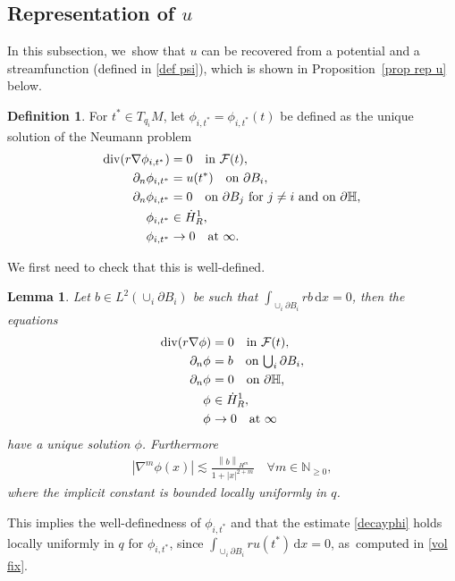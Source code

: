 \documentclass[10pt]{amsart}
\let\ts\textstyle
\newtheorem{lemma}[theorem]{Lemma}
\theoremstyle{definition}
\newtheorem{definition}[theorem]{Definition}
\renewcommand{\div}{\operatorname{div}}
\newcommand\N{\mathbb{N}}
\newcommand\norm[1]{\left\lVert #1\right\rVert}
\newcommand\eq{=}
\newcommand\dd{\,\mathrm{d}}
\newcommand\dx{\dd x}
\let\de\partial
\begin{document}
\subsection{Representation of $u$}\label{repU}
In this subsection, we~show that $u$ can be recovered from a potential and a streamfunction (defined in \ref{def psi}), which is shown in Proposition~\ref{prop rep u} below.

\begin{definition}
For $t^*\in T_{q_i}M$, let $\phi_{i,t^*}=\phi_{i,t^*}(t)$ be defined as the unique solution of the Neumann problem
\begin{align*}
\div(r\nabla\phi_{i,t^*})&\eq0 \quad\text{\normalfont{in} $\mathcal{F}(t)$},\\
\de_n\phi_{i,t^*}&\eq u(t^*) \quad\text{\normalfont{on} $\de B_i$},\\
\de_n\phi_{i,t^*}&\eq 0 \quad\text{\normalfont{on} $\de B_j$ \normalfont{for} $j\neq i$ \normalfont{and on} $\de\mathbb{H}$},\\
\phi_{i,t^*}&\in \dot{H}_R^1,\\
\phi_{i,t^*}&\to 0\quad\text{at $\infty$}.
\end{align*}
\end{definition}

We first need to check that this is well-defined.

\begin{lemma}\label{ExistencePhi}
Let $b\in L^2(\cup_i \de B_i)$ be such that $\int_{\cup_i\de B_i}rb\dx=0$, then the equations
\begin{align*}
\div(r\nabla\phi)&\eq0 \quad\text{\normalfont{in} $\mathcal{F}(t)$},\\
\de_n\phi_{}&\eq b \quad\text{\normalfont{on} $\ts\bigcup_i \de B_i$},\\
\de_n\phi_{}&\eq 0 \quad\text{\normalfont{on} $\de\mathbb{H}$},\\
\phi_{}&\in \dot{H}_R^1,\\
\phi_{}&\to 0\quad\text{at $\infty$}
\end{align*}
have a unique solution $\phi$. Furthermore
\begin{align}\label{decayphi}
|\nabla^m\phi(x)|\lesssim \frac{\norm{b}_{H^{m}}}{1+|x|^{2+m}} \quad\forall m\in\N_{\geq 0},
\end{align}
where the implicit constant is bounded locally uniformly in $q$.

\end{lemma}

This implies the well-definedness of $\phi_{i,t^*}$ and that the estimate \eqref{decayphi} holds locally uniformly in $q$ for $\phi_{i,t^*}$, since $\int_{\cup_i\de B_i} ru(t^*)\dx=0$, as~computed in \eqref{vol fix}.
\end{document}
